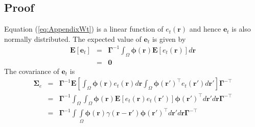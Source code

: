 \documentclass[12pt]{iopart}		%
\begin{document}
\subsection*{Proof}
 Equation (\ref{eq:AppendixWt}) is a linear function of $e_t(\mathbf r)$ and hence $\mathbf{e}_t$ is also normally distributed. The expected value of $\mathbf e_t$ is given by 
\begin{eqnarray}
 \mathbf E\left[ \mathbf e_t\right]&=& \mathbf{\Gamma}^{-1}\int_{\Omega}\boldsymbol\phi\left(\mathbf{r}\right)\mathbf E\left[e_t\left(\mathbf{r}\right)\right] d\mathbf{r} \nonumber \\
&=&\mathbf 0
\end{eqnarray}
The covariance of $\mathbf{e}_t$ is
\begin{eqnarray}
\mathbf{\Sigma}_e&=&\mathbf{\Gamma}^{-1}\mathbf E[\int_{\Omega}\boldsymbol{\phi}\left(\mathbf{r}\right)e_t\left(\mathbf{r}\right)d\mathbf{r} \int_{\Omega}\boldsymbol{\phi}\left(\mathbf{r}'\right)^{\top} e_t\left(\mathbf{r}'\right)d\mathbf{r}']\mathbf{\Gamma}^{- \top} \nonumber \\
&=&\mathbf{\Gamma}^{-1}\int_{\Omega}\int_{\Omega} \boldsymbol{\phi}\left(\mathbf{r}\right) \mathbf E[e_t\left(\mathbf{r}\right)e_t\left(\mathbf{r}'\right)]\boldsymbol{\phi}\left(\mathbf{r}'\right)^{\top}d\mathbf{r}' d\mathbf r\mathbf{\Gamma}^{- \top} \nonumber\\
&=&\mathbf{\Gamma}^{-1}\int\int\limits_{\Omega}\boldsymbol{\phi}\left(\mathbf r\right) \gamma\left(\mathbf r- \mathbf r' \right)\boldsymbol{\phi}\left(\mathbf r'\right)^{\top}d\mathbf r' d\mathbf r\mathbf{\Gamma}^{- \top} 
\end{eqnarray}
\end{document}
